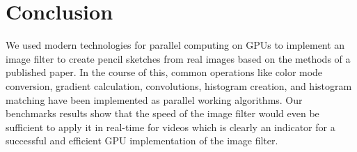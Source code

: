 \section{Conclusion}
We used modern technologies for parallel computing on GPUs to implement
an image filter to create pencil sketches from real images based on the
methods of a published paper.
In the course of this, common operations like color mode conversion,
gradient calculation, convolutions, histogram creation, and histogram
matching have been implemented as parallel working algorithms.
Our benchmarks results show that the speed of the image filter would even
be sufficient to apply it in real-time for videos which is clearly an
indicator for a successful and efficient GPU implementation of the image
filter.

